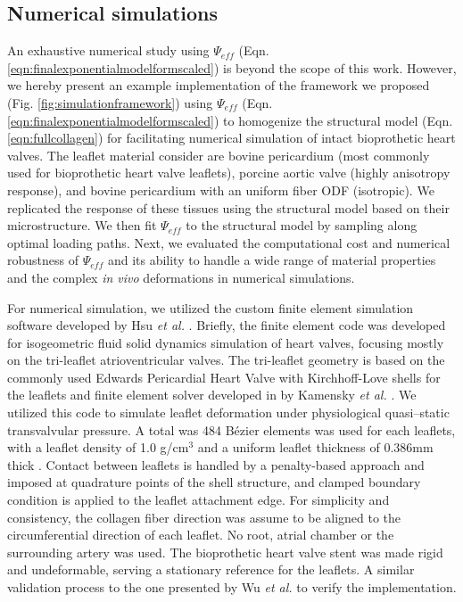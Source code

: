 \subsection{Numerical simulations}

	An exhaustive numerical study using $\Psi_{eff}$ (Eqn. \ref{eqn:finalexponentialmodelformscaled}) is beyond the scope of this work. However, we hereby present an example implementation of the framework we proposed (Fig. \ref{fig:simulationframework}) using $\Psi_{eff}$ (Eqn. \ref{eqn:finalexponentialmodelformscaled}) to homogenize the structural model (Eqn. \ref{eqn:fullcollagen}) for facilitating numerical simulation of intact bioprothetic heart valves. The leaflet material consider are bovine pericardium (most commonly used for bioprothetic heart valve leaflets), porcine aortic valve (highly anisotropy response), and bovine pericardium with an uniform fiber ODF (isotropic). We replicated the response of these tissues using the structural model based on their microstructure. We then fit $\Psi_{eff}$ to the structural model by sampling along optimal loading paths. Next, we evaluated the computational cost and numerical robustness of $\Psi_{eff}$ and its ability to handle a wide range of material properties and the complex \textit{in vivo} deformations in numerical simulations.
    
    
    For numerical simulation, we utilized the custom finite element simulation software developed by Hsu \textit{et al.} \cite{hsu_dynamic_2015, kamensky_immersogeometric_2015, kiendl_isogeometric_2015, wu_anisotropic_2018}. Briefly, the finite element code was developed for isogeometric fluid solid dynamics simulation of heart valves, focusing mostly on the tri-leaflet atrioventricular valves. The tri-leaflet geometry is based on the commonly used Edwards Pericardial Heart Valve with Kirchhoff-Love shells for the leaflets \cite{kiendl_isogeometric_2015} and finite element solver developed in by Kamensky \textit{et al.} \cite {kamensky_immersogeometric_2015}. We utilized this code to simulate leaflet deformation under physiological quasi--static transvalvular pressure. 
    A total was 484 B\'ezier elements was used for each leaflets, with a leaflet density of 1.0 g/cm$^3$ and a uniform leaflet thickness of 0.386mm thick \cite{hsu_dynamic_2015}. Contact between leaflets is handled by a penalty-based approach and imposed at quadrature points of the shell structure, and clamped boundary condition is applied to the leaflet attachment edge. 
    For simplicity and consistency, the collagen fiber direction was assume to be aligned to the circumferential direction of each leaflet. No root, atrial chamber or the surrounding artery was used. The bioprothetic heart valve stent was made rigid and undeformable, serving a stationary reference for the leaflets. A similar validation process to the one presented by Wu \textit{et al.} \cite{wu_anisotropic_2018} to verify the implementation.

